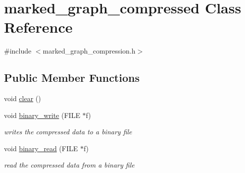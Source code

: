 \hypertarget{classmarked__graph__compressed}{}\section{marked\+\_\+graph\+\_\+compressed Class Reference}
\label{classmarked__graph__compressed}


{\ttfamily \#include $<$marked\+\_\+graph\+\_\+compression.\+h$>$}

\subsection*{Public Member Functions}
\begin{DoxyCompactItemize}
\item 
void \hyperlink{classmarked__graph__compressed_af58307bfadcaa4c3ca6dd594c2f9b3a9}{clear} ()
\item 
void \hyperlink{classmarked__graph__compressed_ab9cdb7fc43badd58fb5202f74ffac723}{binary\+\_\+write} (F\+I\+LE $\ast$f)
\begin{DoxyCompactList}\small\item\em writes the compressed data to a binary file \end{DoxyCompactList}\item 
void \hyperlink{classmarked__graph__compressed_a9db2d11bd63ad3d5a75e47b4023a89dd}{binary\+\_\+read} (F\+I\+LE $\ast$f)
\begin{DoxyCompactList}\small\item\em read the compressed data from a binary file \end{DoxyCompactList}\end{DoxyCompactItemize}

